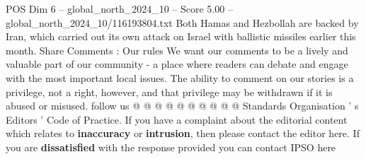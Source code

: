 \begin{textsample}{POS Dim 6 – global\_north\_2024\_10 – Score 5.00 – global\_north\_2024\_10/116193804.txt}
Both Hamas and Hezbollah are backed by Iran, which carried out its own attack on Israel with ballistic missiles earlier this month.
Share Comments : Our rules We want our comments to be a lively and valuable part of our community - a place where readers can debate and engage with the most important local issues.
The ability to comment on our stories is a privilege, not a right, however, and that privilege may be withdrawn if it is abused or misused. follow us @ @ @ @ @ @ @ @ @ @ Standards Organisation ' s Editors ' Code of Practice.
If you have a complaint about the editorial content which relates to \textbf{inaccuracy} or \textbf{intrusion}, then please contact the editor here.
If you are \textbf{dissatisfied} with the response provided you can contact IPSO here

\end{textsample}
